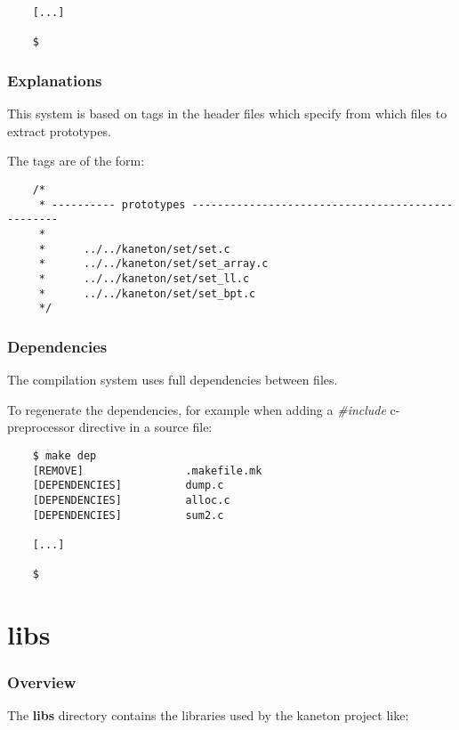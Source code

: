 {\begin{frame}[containsverbatim]
\begin{verbatim}
    [...]

    $
  \end{verbatim}
\end{frame}


\begin{frame}[containsverbatim]
  \frametitle{Explanations}

  This system is based on tags in the header files which specify
  from which files to extract prototypes.

  \nl

  The tags are of the form:

  \begin{verbatim}
    /*
     * ---------- prototypes -------------------------------------------------
     *
     *      ../../kaneton/set/set.c
     *      ../../kaneton/set/set_array.c
     *      ../../kaneton/set/set_ll.c
     *      ../../kaneton/set/set_bpt.c
     */
  \end{verbatim}
\end{frame}


\begin{frame}[containsverbatim]
  \frametitle{Dependencies}

  The compilation system uses full dependencies between files.

  \nl

  To regenerate the dependencies, for example when adding a
  \textit{\#include} c-preprocessor directive in a source file:

  \begin{verbatim}
    $ make dep
    [REMOVE]                .makefile.mk
    [DEPENDENCIES]          dump.c
    [DEPENDENCIES]          alloc.c
    [DEPENDENCIES]          sum2.c

    [...]

    $
  \end{verbatim}
\end{frame}

%
%

\section{libs}


\begin{frame}
  \frametitle{Overview}

  The \textbf{libs} directory contains the libraries used by the kaneton
  project like:


\end{frame}}
